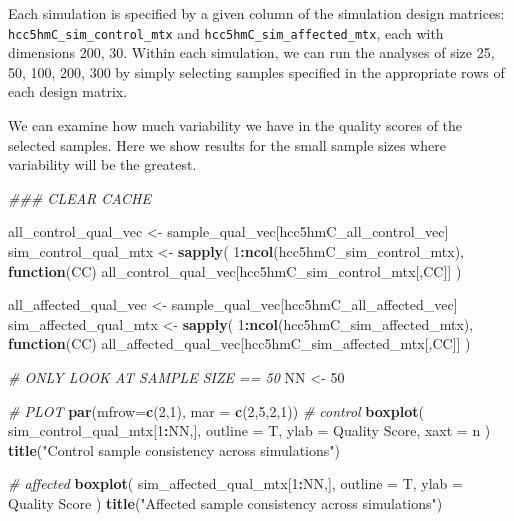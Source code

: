 \documentclass[
]{book}
\newenvironment{Shaded}{\begin{snugshade}}{\end{snugshade}}
\newcommand{\CommentTok}[1]{\textcolor[rgb]{0.56,0.35,0.01}{\textit{#1}}}
\newcommand{\ControlFlowTok}[1]{\textcolor[rgb]{0.13,0.29,0.53}{\textbf{#1}}}
\newcommand{\DataTypeTok}[1]{\textcolor[rgb]{0.13,0.29,0.53}{#1}}
\newcommand{\DecValTok}[1]{\textcolor[rgb]{0.00,0.00,0.81}{#1}}
\newcommand{\KeywordTok}[1]{\textcolor[rgb]{0.13,0.29,0.53}{\textbf{#1}}}
\newcommand{\NormalTok}[1]{#1}
\newcommand{\OperatorTok}[1]{\textcolor[rgb]{0.81,0.36,0.00}{\textbf{#1}}}
\newcommand{\StringTok}[1]{\textcolor[rgb]{0.31,0.60,0.02}{#1}}
\begin{document}
Each simulation is specified by a given column of the simulation design matrices:
\texttt{hcc5hmC\_sim\_control\_mtx} and \texttt{hcc5hmC\_sim\_affected\_mtx}, each with dimensions 200, 30.
Within each simulation, we can run the analyses of size 25, 50, 100, 200, 300 by simply selecting
samples specified in the appropriate rows of each design matrix.

We can examine how much variability we have in the quality scores of the selected samples.
Here we show results for the small sample sizes where variability will be the greatest.

\begin{Shaded}
\begin{Highlighting}[]
\CommentTok{\#\#\# CLEAR CACHE}

\NormalTok{all\_control\_qual\_vec <{-}}\StringTok{ }\NormalTok{sample\_qual\_vec[hcc5hmC\_all\_control\_vec]}
\NormalTok{sim\_control\_qual\_mtx <{-}}\StringTok{ }\KeywordTok{sapply}\NormalTok{(}
  \DecValTok{1}\OperatorTok{:}\KeywordTok{ncol}\NormalTok{(hcc5hmC\_sim\_control\_mtx), }
  \ControlFlowTok{function}\NormalTok{(CC) all\_control\_qual\_vec[hcc5hmC\_sim\_control\_mtx[,CC]]}
\NormalTok{ )}

\NormalTok{all\_affected\_qual\_vec <{-}}\StringTok{ }\NormalTok{sample\_qual\_vec[hcc5hmC\_all\_affected\_vec]}
\NormalTok{sim\_affected\_qual\_mtx <{-}}\StringTok{ }\KeywordTok{sapply}\NormalTok{(}
  \DecValTok{1}\OperatorTok{:}\KeywordTok{ncol}\NormalTok{(hcc5hmC\_sim\_affected\_mtx),  }
  \ControlFlowTok{function}\NormalTok{(CC) all\_affected\_qual\_vec[hcc5hmC\_sim\_affected\_mtx[,CC]]}
\NormalTok{ )}

\CommentTok{\# ONLY LOOK AT SAMPLE SIZE == 50}
\NormalTok{NN <{-}}\StringTok{ }\DecValTok{50}

\CommentTok{\# PLOT}
\KeywordTok{par}\NormalTok{(}\DataTypeTok{mfrow=}\KeywordTok{c}\NormalTok{(}\DecValTok{2}\NormalTok{,}\DecValTok{1}\NormalTok{), }\DataTypeTok{mar =} \KeywordTok{c}\NormalTok{(}\DecValTok{2}\NormalTok{,}\DecValTok{5}\NormalTok{,}\DecValTok{2}\NormalTok{,}\DecValTok{1}\NormalTok{))}
\CommentTok{\# control}
\KeywordTok{boxplot}\NormalTok{(}
\NormalTok{  sim\_control\_qual\_mtx[}\DecValTok{1}\OperatorTok{:}\NormalTok{NN,],}
  \DataTypeTok{outline =}\NormalTok{ T, }
  \DataTypeTok{ylab =} \StringTok{\textquotesingle{}Quality Score\textquotesingle{}}\NormalTok{,}
  \DataTypeTok{xaxt =} \StringTok{\textquotesingle{}n\textquotesingle{}}
\NormalTok{)}
\KeywordTok{title}\NormalTok{(}\StringTok{"Control sample consistency across simulations"}\NormalTok{)}

\CommentTok{\# affected}
\KeywordTok{boxplot}\NormalTok{(}
\NormalTok{  sim\_affected\_qual\_mtx[}\DecValTok{1}\OperatorTok{:}\NormalTok{NN,],}
  \DataTypeTok{outline =}\NormalTok{ T, }
  \DataTypeTok{ylab =} \StringTok{\textquotesingle{}Quality Score\textquotesingle{}}
\NormalTok{)}
\KeywordTok{title}\NormalTok{(}\StringTok{"Affected sample consistency across simulations"}\NormalTok{)}
\end{Highlighting}
\end{Shaded}
\end{document}
